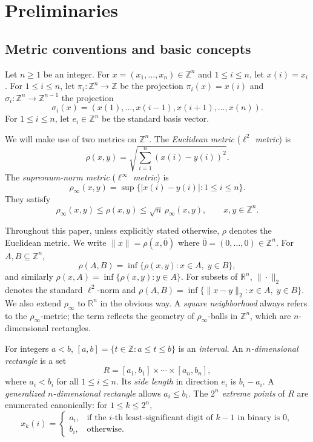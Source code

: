 \documentclass{amsart}
\theoremstyle{definition}
\begin{document}
\section{Preliminaries}\label{sec:prelim}

\subsection{Metric conventions and basic concepts}

Let $n\geq 1$ be an integer. For $x=(x_1,\dots, x_n)\in\mathbb{Z}^n$ and
$1\leq i\leq n$, let $x(i)=x_i$. For $1\leq i\leq n$, let
$\pi_i\colon \mathbb{Z}^n\to \mathbb{Z}$ be the projection
$\pi_i(x)=x(i)$ and $\sigma_i\colon \mathbb{Z}^n\to\mathbb{Z}^{n-1}$ the
projection
\[
\sigma_i(x)=(x(1),\dots, x(i-1), x(i+1), \dots, x(n)).
\]
For $1\leq i\leq n$, let $e_i\in\mathbb{Z}^n$ be the standard basis vector.

We will make use of two metrics on $\mathbb{Z}^n$. The {\em Euclidean metric}
({\em $\ell^2$ metric}) is
\[
\rho(x,y)=\sqrt{\sum_{i=1}^n (x(i)-y(i))^2}.
\]
The {\em supremum-norm metric} ({\em $\ell^\infty$ metric}) is
\[
\rho_\infty(x,y)=\sup\{|x(i)-y(i)|\colon 1\leq i\leq n\}.
\]
They satisfy
\[
\rho_\infty(x,y)\leq \rho(x,y)\leq \sqrt{n}\,\rho_\infty(x,y),\qquad
x,y\in\mathbb{Z}^n.
\]

Throughout this paper, unless explicitly stated otherwise, $\rho$ denotes
the Euclidean metric. We write $\|x\|=\rho(x,\overline{0})$ where
$\overline{0}=(0,\dots,0)\in\mathbb{Z}^n$. For $A, B\subseteq \mathbb{Z}^n$,
\[
\rho(A, B)=\inf\{\rho(x,y)\colon x\in A,\; y\in B\},
\]
and similarly $\rho(x,A)=\inf\{\rho(x,y)\colon y\in A\}$.
For subsets of $\mathbb{R}^n$, $\|\cdot\|_2$ denotes the standard
$\ell^2$-norm and $\rho(A,B)=\inf\{\|x-y\|_2\colon x\in A,\;y\in B\}$.
We also extend $\rho_\infty$ to $\mathbb{R}^n$ in the obvious way.
A {\em square neighborhood} always refers to the $\rho_\infty$-metric; the
term reflects the geometry of $\rho_\infty$-balls in $\mathbb{Z}^n$, which
are $n$-dimensional rectangles.

For integers $a<b$, $[a,b]=\{t\in\mathbb{Z}\colon a\leq t\leq b\}$ is an
{\em interval}. An {\em $n$-dimensional rectangle} is a set
\[
R=[a_1,b_1]\times \cdots\times[a_n, b_n],
\]
where $a_i<b_i$ for all $1\leq i\leq n$. Its {\em side length} in direction
$e_i$ is $b_i-a_i$. A {\em generalized $n$-dimensional rectangle} allows
$a_i\leq b_i$. The $2^n$ {\em extreme points} of $R$ are enumerated
canonically: for $1\leq k\leq 2^n$,
\[
x_k(i)=\begin{cases}
a_i, & \text{if the $i$-th least-significant digit of $k-1$ in
binary is $0$},\\
b_i, & \text{otherwise}.
\end{cases}
\]
\end{document}
